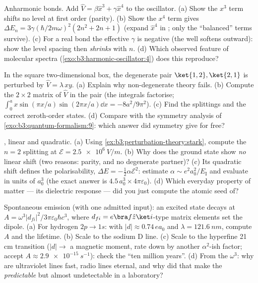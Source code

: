 \begin{exercise}[$\star\star$]\label{exo:b3:perturbation-theory:5}
Anharmonic bonds. Add $\hat V = \beta\hat x^3 + \gamma\hat x^4$ to
the oscillator. (a) Show the $x^3$ term shifts no level at first
order (parity). (b) Show the $x^4$ term gives $\Delta E_n =
3\gamma(\hbar/2m\omega)^2(2n^2 + 2n + 1)$ (expand $\hat x^4$ in
; only the ``balanced'' terms survive). (c) For a real bond the effective $\gamma$ is negative (the well
softens outward): show the level spacing then \emph{shrinks} with
$n$.
(d) Which observed feature of molecular spectra
(\cref{exo:b3:harmonic-oscillator:4}) does this reproduce?
\end{exercise}

\begin{exercise}[$\star\star$]\label{exo:b3:perturbation-theory:6}
In the square two-dimensional box, the degenerate pair $\ket{1,2},
\ket{2,1}$ is perturbed by $\hat V = \lambda\,xy$. (a) Explain why
non-degenerate theory fails. (b) Compute the $2\times2$ matrix of
$\hat V$ in the pair (the integrals factorise; $\int_0^a
x\sin(\pi x/a)\sin(2\pi x/a)\dd x = -8a^2/9\pi^2$). (c) Find the
splittings and the correct zeroth-order states. (d) Compare with
the symmetry analysis of \cref{exo:b3:quantum-formalism:9}: which
answer did symmetry give for free?
\end{exercise}

\begin{exercise}[$\star\star$]\label{exo:b3:perturbation-theory:7}
, linear and quadratic. (a) Using
\cref{ex:b3:perturbation-theory:stark}, compute the $n = 2$
splitting at $\mathcal E = \qty{2.5e6}{V/m}$. (b) Why does the
ground state show \emph{no} linear shift (two reasons: parity, and
no degenerate partner)? (c) Its quadratic shift defines the
polarisability, $\Delta E = -\tfrac12\alpha\mathcal E^2$: estimate
$\alpha \sim e^2a_0^2/E_{\text{I}}$ and evaluate in units of
$a_0^3$ (the exact answer is $4.5\,a_0^3 \times
4\pi\varepsilon_0$). (d) Which everyday property of matter ---
its dielectric response --- did you just compute the atomic seed
of?
\end{exercise}

\begin{exercise}[$\star\star$]\label{exo:b3:perturbation-theory:8}
Spontaneous emission (with one admitted input): an excited state
decays at $A = \omega^3|d_{fi}|^2/3\pi\varepsilon_0\hbar c^3$,
where $d_{fi} = e\bra f\hat z\ket i$-type matrix elements set the
dipole. (a) For hydrogen $2p \to 1s$: with $|d| \approx 0.74\,
ea_0$ and $\lambda = \qty{121.6}{nm}$, compute $A$ and the
lifetime. (b) Scale to the sodium D line. (c) Scale to the
hyperfine 21 cm transition ($|d| \to$ a magnetic moment, rate
down by another $\alpha^2$-ish factor; accept $A \approx
\qty{2.9e-15}{s^{-1}}$): check the ``ten million years''. (d)
From the $\omega^3$: why are ultraviolet lines fast, radio lines
eternal, and why did that make the 
\emph{predictable} but almost undetectable in a laboratory?
\end{exercise}

